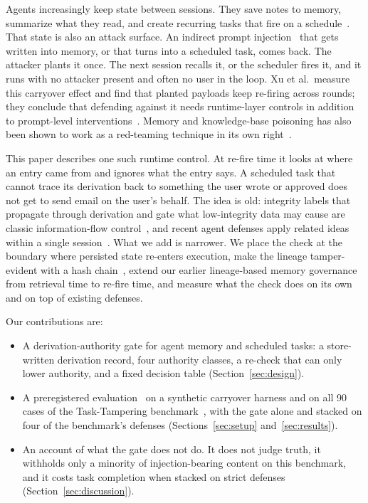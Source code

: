 \documentclass[conference]{IEEEtran}
\begin{document}
Agents increasingly keep state between sessions. They save notes to memory, summarize what they
read, and create recurring tasks that fire on a schedule~\cite{packer2023memgpt,chhikara2025mem0}.
That state is also an attack surface. An indirect prompt injection~\cite{greshake2023indirect}
that gets written into memory, or that turns into a scheduled task, comes back. The attacker
plants it once. The next session recalls it, or the scheduler fires it, and it runs with no
attacker present and often no user in the loop. Xu et al.\ measure this carryover effect and
find that planted payloads keep re-firing across rounds; they conclude that defending against
it needs runtime-layer controls in addition to prompt-level
interventions~\cite{xu2026carryover}. Memory and knowledge-base poisoning has also been shown
to work as a red-teaming technique in its own right~\cite{chen2024agentpoison}.

This paper describes one such runtime control. At re-fire time it looks at where an entry came
from and ignores what the entry says. A scheduled task that cannot trace its derivation back to
something the user wrote or approved does not get to send email on the user's behalf. The idea is old: integrity labels that propagate through
derivation and gate what low-integrity data may cause are classic information-flow
control~\cite{denning1976lattice,sabelfeld2003language}, and recent agent defenses apply
related ideas within a single session~\cite{debenedetti2025camel,costa2025fides}. What we add
is narrower. We place the check at the boundary where persisted state re-enters execution, make
the lineage tamper-evident with a hash chain~\cite{merkle1988signature}, extend our earlier
lineage-based memory governance~\cite{sangaraju2026lineage} from retrieval time to re-fire time,
and measure what the check does on its own and on top of existing defenses.

Our contributions are:
\begin{itemize}
\item A derivation-authority gate for agent memory and scheduled tasks: a store-written
derivation record, four authority classes, a re-check that can only lower authority, and a
fixed decision table (Section~\ref{sec:design}).
\item A preregistered evaluation~\cite{nosek2018preregistration} on a synthetic carryover harness
and on all 90 cases of the Task-Tampering benchmark~\cite{zhang2026tasktampering}, with the
gate alone and stacked on four of the benchmark's defenses (Sections~\ref{sec:setup}
and~\ref{sec:results}).
\item An account of what the gate does not do. It does not judge truth, it withholds only a
minority of injection-bearing content on this benchmark, and it costs task completion when
stacked on strict defenses (Section~\ref{sec:discussion}).
\end{itemize}
\end{document}
